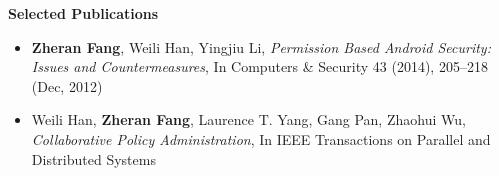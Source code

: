 \documentclass[letterpaper,10pt]{article}
\newcommand{\resheading}[1]{{\large \colorbox{mygrey}{\begin{minipage}{\textwidth}{\textbf{#1 \vphantom{p\^{E}}}}\end{minipage}}}}
\begin{document}



	





\resheading{Selected Publications}
\begin{itemize}
 \item 
 \textbf{Zheran Fang}, Weili Han, Yingjiu Li, \emph{Permission Based Android Security: Issues and Countermeasures}, In Computers \& Security 43 (2014), 205–218 (Dec, 2012)

 \item
  Weili Han, \textbf{Zheran Fang}, Laurence T. Yang, Gang Pan, Zhaohui Wu, \emph{Collaborative Policy Administration}, In IEEE Transactions on Parallel and Distributed Systems
\end{itemize}




\end{document}
